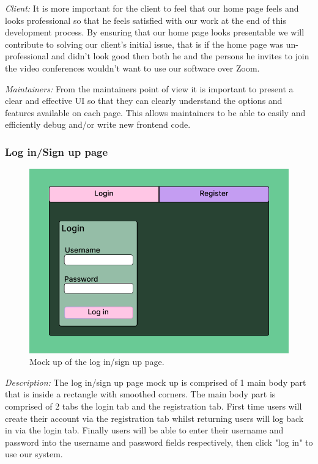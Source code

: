 \textit{Client:} It is more important for the client to
feel that our home page feels and looks professional so
that he feels satisfied with our work at the end of this
development process. By ensuring that our home page looks
presentable we will contribute to solving our client's
initial issue, that is if the home page was un-professional
and didn't look good then both he and the persons he invites
to join the video conferences wouldn't want to use our
software over Zoom. \\ \vspace{0.2cm}

\textit{Maintainers:} From the maintainers point of view it
is important to present a clear and effective UI so that
they can clearly understand the options and features
available on each page. This allows maintainers to be able
to easily and efficiently debug and/or write new frontend
code.

\subsubsection{Log in/Sign up page}

\begin{figure}[H]
\centering

\includegraphics[scale=0.2]{Images/Login_Page_1.png}

\caption{Mock up of the log in/sign up page.}
\label{fig:login}
\end{figure}

\textit{Description:}
The log in/sign up page mock up is comprised of 1 main
body part that is inside a rectangle with smoothed corners.
The main body part is comprised of 2 tabs the login tab and
the registration tab. First time users will create their
account via the registration tab whilst returning users will
log back in via the login tab. Finally users will be able to
enter their username and password into the username and
password fields respectively, then click "log in" to use our
system.
\\ \vspace{0.2cm}

